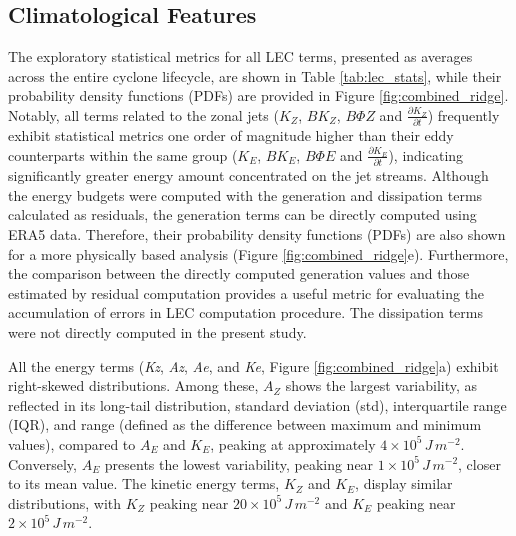 \documentclass[pdflatex,sn-chicago]{sn-jnl}%
\theoremstyle{plain}
\theoremstyle{definition}
\theoremstyle{remark}
\theoremstyle{definition}
\begin{document}
\subsection{Climatological Features}\label{sec:climatology}

The exploratory statistical metrics for all LEC terms, presented as averages across the entire cyclone lifecycle, are shown in Table \ref{tab:lec_stats}, while their probability density functions (PDFs) are provided in Figure \ref{fig:combined_ridge}. Notably, all terms related to the zonal jets ($K_Z$, $BK_Z$, $B\Phi Z$ and \(\frac{\partial K_Z}{\partial t}\)) frequently exhibit statistical metrics one order of magnitude higher than their eddy counterparts within the same group ($K_E$, $BK_E$, $B\Phi E$ and \(\frac{\partial K_E}{\partial t}\)), indicating significantly greater energy amount concentrated on the jet streams. Although the energy budgets were computed with the generation and dissipation terms calculated as residuals, the generation terms can be directly computed using ERA5 data. Therefore, their probability density functions (PDFs) are also shown for a more physically based analysis (Figure \ref{fig:combined_ridge}e). Furthermore, the comparison between the directly computed generation values and those estimated by residual computation provides a useful metric for evaluating the accumulation of errors in LEC computation procedure. The dissipation terms were not directly computed in the present study.


All the energy terms (\textit{Kz}, \textit{Az}, \textit{Ae}, and \textit{Ke}, Figure \ref{fig:combined_ridge}a) exhibit right-skewed distributions. Among these, $A_Z$ shows the largest variability, as reflected in its long-tail distribution, standard deviation (std), interquartile range (IQR), and range (defined as the difference between maximum and minimum values), compared to $A_E$ and $K_E$, peaking at approximately $4 \times 10^5 \, J \, m^{-2}$. Conversely, $A_E$ presents the lowest variability, peaking near $1 \times 10^5 \, J \, m^{-2}$, closer to its mean value. The kinetic energy terms, $K_Z$ and $K_E$, display similar distributions, with $K_Z$ peaking near $20 \times 10^5 \, J \, m^{-2}$ and $K_E$ peaking near $2 \times 10^5 \, J \, m^{-2}$.
\end{document}
